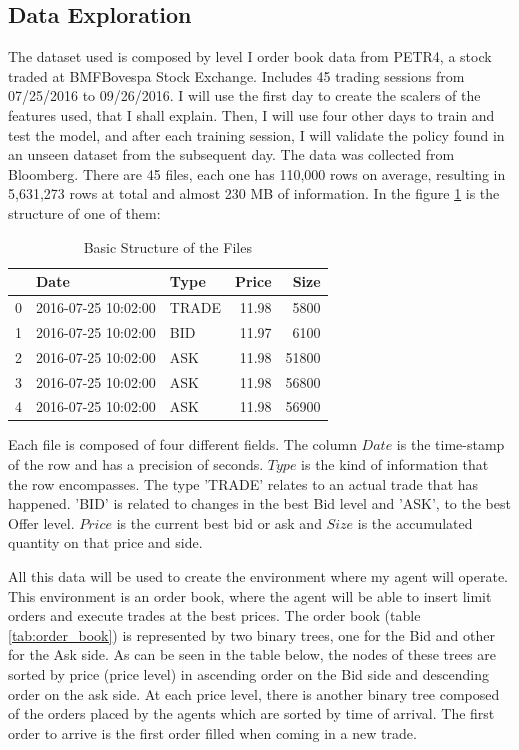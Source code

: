 \documentclass[a4paper]{article}
\begin{document}
\subsection{Data Exploration}
The dataset used is composed by level I order book data from PETR4, a stock traded at BMFBovespa Stock Exchange. Includes 45 trading sessions from 07/25/2016 to 09/26/2016. I will use the first day to create the scalers of the features used, that I shall explain. Then, I will use four other days to train and test the model, and after each training session, I will validate the policy found in an unseen dataset from the subsequent day. The data was collected from Bloomberg. There are 45 files, each one has 110,000 rows on average, resulting in 5,631,273 rows at total and almost  230 MB of information. In the figure \ref{tab:original_data} is the structure of one of them:

\begin{table}[ht!]
\centering
\begin{tabular}{l|llrr}
{} &                Date &   Type &  Price &   Size \\
\midrule
0 & 2016-07-25 10:02:00 &  TRADE &  11.98 &   5800 \\
1 & 2016-07-25 10:02:00 &    BID &  11.97 &   6100 \\
2 & 2016-07-25 10:02:00 &    ASK &  11.98 &  51800 \\
3 & 2016-07-25 10:02:00 &    ASK &  11.98 &  56800 \\
4 & 2016-07-25 10:02:00 &    ASK &  11.98 &  56900 \\

\end{tabular}
\caption{\label{tab:original_data}Basic Structure of the Files}
\end{table}

Each file is composed of four different fields. The column $Date$ is the time-stamp of the row and has a precision of seconds. $Type$ is the kind of information that the row encompasses. The type 'TRADE' relates to an actual trade that has happened. 'BID' is related to changes in the best Bid level and 'ASK', to the best Offer level. $Price$ is the current best bid or ask and $Size$ is the accumulated quantity on that price and side.

All this data will be used to create the environment where my agent will operate. This environment is an order book, where the agent will be able to insert limit orders and execute trades at the best prices. The order book (table \ref{tab:order_book}) is represented by two binary trees, one for the Bid and other for the Ask side. As can be seen in the table below, the nodes of these trees are sorted by price (price level) in ascending order on the Bid side and descending order on the ask side. At each price level, there is another binary tree composed of the orders placed by the agents which are sorted by time of arrival. The first order to arrive is the first order filled when coming in a new trade.
\end{document}
